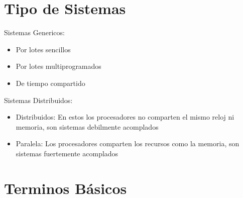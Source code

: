 \documentclass[12pt, fleqn]{report}                             %
\begin{document}
        \section{Tipo de Sistemas}

            Sistemas Genericos:
            \begin{itemize}
                \item Por lotes sencillos
                \item Por lotes multiprogramados
                \item De tiempo compartido
            \end{itemize}

            Sistemas Distribuidos:
            \begin{itemize}
                \item Distribuidos: En estos los procesadores no comparten el mismo reloj ni memoria, son sistemas
                    debilmente acomplados
                \item Paralela: Los procesadores comparten los recursos como la memoria, son sistemas fuertemente
                    acomplados
            \end{itemize}     

        \clearpage
        \section{Terminos Básicos}
\end{document}
